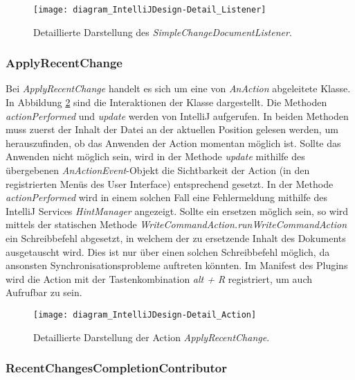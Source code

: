 \begin{figure}
    \centering
    \texttt{[image: diagram\_IntelliJDesign-Detail\_Listener]}
    \caption{Detaillierte Darstellung des \emph{SimpleChangeDocumentListener}.}
    \label{fig:diagram_IntelliJDesign-Detail_Listener}
\end{figure}

\subsubsection{ApplyRecentChange}

Bei \emph{ApplyRecentChange} handelt es sich um eine von
\emph{AnAction} abgeleitete Klasse. In Abbildung
\ref{fig:diagram_IntelliJDesign-Detail_Action} sind die Interaktionen
der Klasse dargestellt. Die Methoden \emph{actionPerformed} und \emph{update}
werden von IntelliJ aufgerufen. In beiden Methoden muss zuerst
der Inhalt der Datei an der aktuellen Position gelesen werden, um 
herauszufinden, ob das Anwenden der Action momentan möglich ist.
Sollte das Anwenden nicht möglich sein, wird
in der Methode \emph{update} mithilfe des übergebenen
\emph{AnActionEvent}-Objekt die Sichtbarkeit der Action (in den
registrierten Menüs des User Interface) entsprechend gesetzt.
In der Methode \emph{actionPerformed} wird in einem solchen Fall
eine Fehlermeldung mithilfe des IntelliJ Services \emph{HintManager}
angezeigt. Sollte ein ersetzen möglich sein,
so wird mittels der statischen Methode 
\emph{WriteCommandAction.runWriteCommandAction} ein Schreibbefehl
abgesetzt, in welchem der zu ersetzende Inhalt des Dokuments 
ausgetauscht wird. Dies ist nur über einen solchen Schreibbefehl möglich,
da ansonsten Synchronisationsprobleme auftreten könnten.
Im Manifest des Plugins wird die Action mit der 
Tastenkombination \emph{alt + R} registriert, um
auch Aufrufbar zu sein.

\begin{figure}
    \centering
    \texttt{[image: diagram\_IntelliJDesign-Detail\_Action]}
    \caption{Detaillierte Darstellung der Action \emph{ApplyRecentChange}.}
    \label{fig:diagram_IntelliJDesign-Detail_Action}
\end{figure}

\subsubsection{RecentChangesCompletionContributor}

